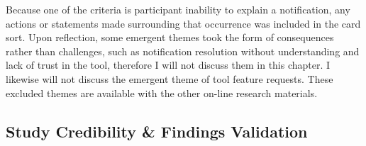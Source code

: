 Because one of the criteria is participant inability to explain a notification, 
any actions or statements made surrounding that occurrence was included in the card sort. 
Upon reflection, some emergent themes took the form of consequences rather than challenges, 
such as notification resolution without understanding and lack of trust in the tool, 
therefore I will not discuss them in this chapter. 
I likewise will not discuss the emergent theme of tool feature requests.
These excluded themes are available with the other on-line research materials.

\subsection{Study Credibility \& Findings Validation}


